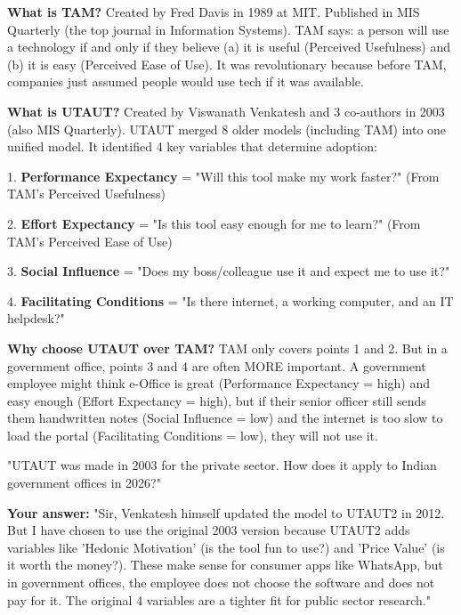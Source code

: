 \documentclass[11pt,a4paper]{article}
\begin{document}
\begin{abox}
\textbf{What is TAM?} Created by Fred Davis in 1989 at MIT. Published in MIS Quarterly (the top journal in Information Systems). TAM says: a person will use a technology if and only if they believe (a) it is useful (Perceived Usefulness) and (b) it is easy (Perceived Ease of Use). It was revolutionary because before TAM, companies just assumed people would use tech if it was available.

\textbf{What is UTAUT?} Created by Viswanath Venkatesh and 3 co-authors in 2003 (also MIS Quarterly). UTAUT merged 8 older models (including TAM) into one unified model. It identified 4 key variables that determine adoption:

1. \textbf{Performance Expectancy} = "Will this tool make my work faster?" (From TAM's Perceived Usefulness)

2. \textbf{Effort Expectancy} = "Is this tool easy enough for me to learn?" (From TAM's Perceived Ease of Use)

3. \textbf{Social Influence} = "Does my boss/colleague use it and expect me to use it?"

4. \textbf{Facilitating Conditions} = "Is there internet, a working computer, and an IT helpdesk?"

\textbf{Why choose UTAUT over TAM?} TAM only covers points 1 and 2. But in a government office, points 3 and 4 are often MORE important. A government employee might think e-Office is great (Performance Expectancy = high) and easy enough (Effort Expectancy = high), but if their senior officer still sends them handwritten notes (Social Influence = low) and the internet is too slow to load the portal (Facilitating Conditions = low), they will not use it.

\begin{qbox}
"UTAUT was made in 2003 for the private sector. How does it apply to Indian government offices in 2026?"
\end{qbox}

\textbf{Your answer:} "Sir, Venkatesh himself updated the model to UTAUT2 in 2012. But I have chosen to use the original 2003 version because UTAUT2 adds variables like 'Hedonic Motivation' (is the tool fun to use?) and 'Price Value' (is it worth the money?). These make sense for consumer apps like WhatsApp, but in government offices, the employee does not choose the software and does not pay for it. The original 4 variables are a tighter fit for public sector research."
\end{abox}
\end{document}
